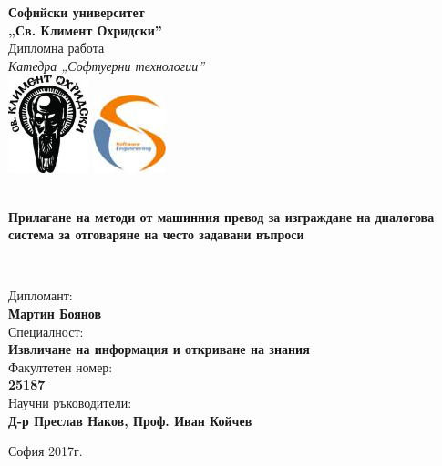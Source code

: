\documentclass[
12pt, %
oneside, %
chapterinoneline,%
english, %
onehalfspacing, %
nolistspacing, %
headsepline, %
]{MastersDoctoralThesis} %
\begin{document}
\sloppy


\mainmatter %

\pagestyle{thesis} %


\begin{titlepage}
\begin{center}

\Large \textbf{Софийски университет \\ „Св. Климент Охридски”}\\[0cm]
\Large Дипломна работа\\[0cm]
\Large \textit{Катедра „Софтуерни технологии”}\\[0.2cm]

\includegraphics{Figures/logo_su.jpg}
\includegraphics{Figures/logo_katedra.jpg}\\[0.1cm]

\HRule \\[0.1cm] %
{\huge \bfseries Прилагане на методи от машинния превод за изграждане на диалогова система за отговаряне на често задавани въпроси
	\par}\vspace{0.1cm} %
\HRule \\[0.2cm] %
 
\begin{flushleft} \large
Дипломант:\\ \textbf{Мартин Боянов}\\
Специалност:\\ \textbf{Извличане на информация и откриване на знания}\\
Факултетен номер:\\ \textbf{25187} \\
Научни ръководители:\\ \textbf{Д-р Преслав Наков, Проф. Иван Койчев}\\[0.2cm]
\end{flushleft}

{\large София 2017г.}\\
 
\vfill
\end{center}
\end{titlepage}
\end{document}
